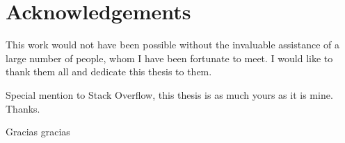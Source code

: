
\chapter*{Acknowledgements}
This work would not have been possible without the invaluable assistance of a large number of people, whom I have been fortunate to meet. I would like to thank them all and dedicate this thesis to them.



 
Special mention to Stack Overflow, this thesis is as much yours as it is mine. Thanks.

Gracias gracias






